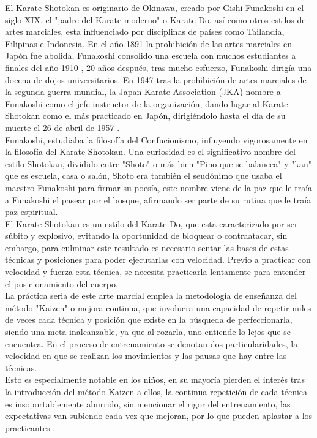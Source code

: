 El Karate Shotokan es originario de Okinawa, creado por Gishi Funakoshi en el siglo XIX, el "padre del Karate moderno" o Karate-Do, así como otros estilos de artes marciales, esta influenciado por disciplinas de países como Tailandia, Filipinas e Indonesia. En el año 1891 la prohibición de las artes marciales en Japón fue abolida, Funakoshi consolido una escuela con muchos estudiantes a finales del año 1910 , 20 años después, tras mucho esfuerzo, Funakoshi dirigía una docena de dojos universitarios. En 1947 tras la prohibición de artes marciales de la segunda guerra mundial, la Japan Karate Association (JKA) nombre a Funakoshi como el jefe instructor de la organización, dando lugar al Karate Shotokan como el más practicado en Japón, dirigiéndolo hasta el día de su muerte el 26 de abril de 1957 \cite{diez2012karate}.\\


Funakoshi, estudiaba la filosofía del Confucionismo, influyendo vigorosamente en la filosofía del Karate Shotokan. Una curiosidad es el significativo nombre del estilo Shotokan, dividido entre "Shoto" o más bien "Pino que se balancea" y "kan" que es escuela, casa o salón, Shoto era también el seudónimo que usaba el maestro Funakoshi para firmar su poesía, este nombre viene de la paz que le traía a Funakoshi el pasear por el bosque, afirmando ser parte de su rutina que le traía paz espiritual. \\

El Karate Shotokan es un estilo del Karate-Do, que esta caracterizado por ser súbito y explosivo, evitando la oportunidad de bloquear o contraatacar, sin embargo, para culminar este resultado es necesario sentar las bases de estas técnicas y posiciones para poder ejecutarlas con velocidad. Previo a practicar con velocidad y fuerza esta técnica, se necesita practicarla lentamente para entender el posicionamiento del cuerpo.\\

La práctica seria de este arte marcial emplea la metodología de enseñanza del método "Kaizen" o mejora continua, que involucra una capacidad de repetir miles de veces cada técnica y posición que existe en la búsqueda de perfeccionarla, siendo una meta inalcanzable, ya que al rozarla, uno entiende lo lejos que se encuentra. En el proceso de entrenamiento se denotan dos particularidades, la velocidad en que se realizan los movimientos y las pausas que hay entre las técnicas.\\

Esto es especialmente notable en los niños, en su mayoría pierden el interés tras la introducción del método Kaizen a ellos, la continua repetición de cada técnica es insoportablemente aburrido, sin mencionar el rigor del entrenamiento, las expectativas van subiendo cada vez que mejoran, por lo que pueden aplastar a los practicantes  \cite{o1999students}.\\


